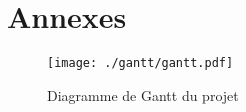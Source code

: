 \section{Annexes}

	\begin{sidewaysfigure}[htb]
		\texttt{[image: ./gantt/gantt.pdf]}
        \label{fig:gantt}
        \caption{Diagramme de Gantt du projet}
	\end{sidewaysfigure}